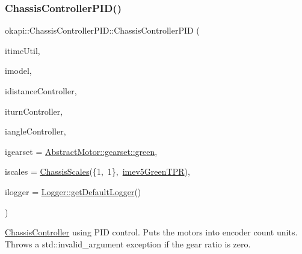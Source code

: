 \subsubsection{\texorpdfstring{ChassisControllerPID()}{ChassisControllerPID()}\hspace{0.1cm}{\footnotesize\ttfamily [1/3]}}
{\footnotesize\ttfamily okapi\+::\+Chassis\+Controller\+P\+I\+D\+::\+Chassis\+Controller\+P\+ID (\begin{DoxyParamCaption}\item[{\mbox{\hyperlink{classokapi_1_1TimeUtil}{Time\+Util}}}]{itime\+Util,  }\item[{std\+::shared\+\_\+ptr$<$ \mbox{\hyperlink{classokapi_1_1ChassisModel}{Chassis\+Model}} $>$}]{imodel,  }\item[{std\+::unique\+\_\+ptr$<$ \mbox{\hyperlink{classokapi_1_1IterativePosPIDController}{Iterative\+Pos\+P\+I\+D\+Controller}} $>$}]{idistance\+Controller,  }\item[{std\+::unique\+\_\+ptr$<$ \mbox{\hyperlink{classokapi_1_1IterativePosPIDController}{Iterative\+Pos\+P\+I\+D\+Controller}} $>$}]{iturn\+Controller,  }\item[{std\+::unique\+\_\+ptr$<$ \mbox{\hyperlink{classokapi_1_1IterativePosPIDController}{Iterative\+Pos\+P\+I\+D\+Controller}} $>$}]{iangle\+Controller,  }\item[{const \mbox{\hyperlink{structokapi_1_1AbstractMotor_1_1GearsetRatioPair}{Abstract\+Motor\+::\+Gearset\+Ratio\+Pair}} \&}]{igearset = {\ttfamily \mbox{\hyperlink{classokapi_1_1AbstractMotor_a88aaa6ea2fa10f5520a537bbf26774d5a9f27410725ab8cc8854a2769c7a516b8}{Abstract\+Motor\+::gearset\+::green}}},  }\item[{const \mbox{\hyperlink{classokapi_1_1ChassisScales}{Chassis\+Scales}} \&}]{iscales = {\ttfamily \mbox{\hyperlink{classokapi_1_1ChassisScales}{Chassis\+Scales}}(\{1,~1\},~\mbox{\hyperlink{namespaceokapi_a5263bab3bfecd482a573b6d04fb584ac}{imev5\+Green\+T\+PR}})},  }\item[{std\+::shared\+\_\+ptr$<$ \mbox{\hyperlink{classokapi_1_1Logger}{Logger}} $>$}]{ilogger = {\ttfamily \mbox{\hyperlink{classokapi_1_1Logger_a5053cf778b4b55acba788a3797dc96d2}{Logger\+::get\+Default\+Logger}}()} }\end{DoxyParamCaption})}

\mbox{\hyperlink{classokapi_1_1ChassisController}{Chassis\+Controller}} using P\+ID control. Puts the motors into encoder count units. Throws a {\ttfamily std\+::invalid\+\_\+argument} exception if the gear ratio is zero.


